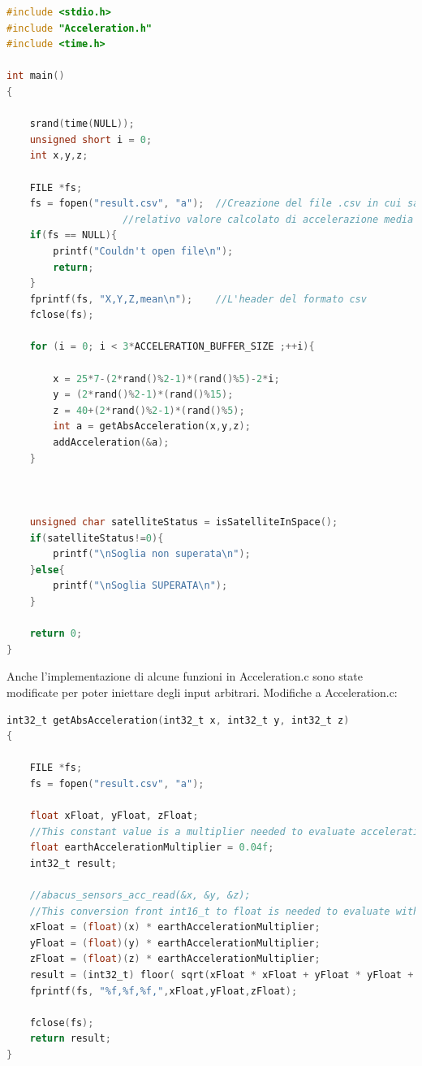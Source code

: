 \documentclass[LaM,binding=0.6cm]{../sapthesis}
\begin{document}
\begin{small}
\begin{lstlisting}[language=C]
#include <stdio.h>
#include "Acceleration.h"
#include <time.h>

int main()
{
    
    srand(time(NULL));
    unsigned short i = 0;
    int x,y,z;
    
    FILE *fs;
    fs = fopen("result.csv", "a");	//Creazione del file .csv in cui salvare i valori di accelerazione e 
					//relativo valore calcolato di accelerazione media
	if(fs == NULL){
	    printf("Couldn't open file\n");
	    return;
	}
	fprintf(fs, "X,Y,Z,mean\n");	//L'header del formato csv
    fclose(fs);
	
    for (i = 0; i < 3*ACCELERATION_BUFFER_SIZE ;++i){
	
    	x = 25*7-(2*rand()%2-1)*(rand()%5)-2*i;
    	y = (2*rand()%2-1)*(rand()%15);
    	z = 40+(2*rand()%2-1)*(rand()%5);
        int a = getAbsAcceleration(x,y,z);
        addAcceleration(&a);
    }    
	
	

    unsigned char satelliteStatus = isSatelliteInSpace();
    if(satelliteStatus!=0){
        printf("\nSoglia non superata\n");
    }else{
        printf("\nSoglia SUPERATA\n");
    }

    return 0;
}
\end{lstlisting}
\end{small}

Anche  l'implementazione di alcune funzioni in Acceleration.c sono state modificate per poter iniettare degli input arbitrari.
\newline
Modifiche a Acceleration.c:
\begin{lstlisting}[language=C]
int32_t getAbsAcceleration(int32_t x, int32_t y, int32_t z)
{
    
    FILE *fs;
    fs = fopen("result.csv", "a");

    float xFloat, yFloat, zFloat;   
    //This constant value is a multiplier needed to evaluate acceleration on earth
    float earthAccelerationMultiplier = 0.04f;
    int32_t result;

    //abacus_sensors_acc_read(&x, &y, &z);
    //This conversion front int16_t to float is needed to evaluate with more precision the absolute value of acceleration
    xFloat = (float)(x) * earthAccelerationMultiplier;
    yFloat = (float)(y) * earthAccelerationMultiplier;
    zFloat = (float)(z) * earthAccelerationMultiplier;
    result = (int32_t) floor( sqrt(xFloat * xFloat + yFloat * yFloat + zFloat * zFloat ) ) ;
    fprintf(fs, "%f,%f,%f,",xFloat,yFloat,zFloat);

    fclose(fs);
    return result;
}
\end{lstlisting}
\end{document}

